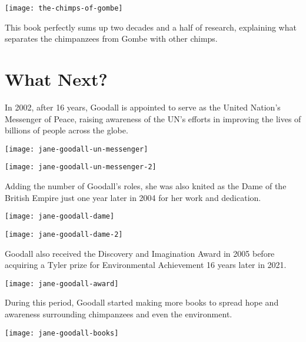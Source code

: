 \documentclass[12pt]{report}
\begin{document}
\texttt{[image: the-chimps-of-gombe]}

This book perfectly sums up two decades and a half of research, explaining what
separates the chimpanzees from Gombe with other chimps.

\pagebreak

\section*{What Next?}

In 2002, after 16 years, Goodall is appointed to serve as the United Nation's
Messenger of Peace, raising awareness of the UN's efforts in improving the
lives of billions of people across the globe.

\texttt{[image: jane-goodall-un-messenger]}

\texttt{[image: jane-goodall-un-messenger-2]}

\pagebreak

Adding the number of Goodall's roles, she was also knited as the Dame of the
British Empire just one year later in 2004 for her work and dedication.

\texttt{[image: jane-goodall-dame]}

\texttt{[image: jane-goodall-dame-2]}

\pagebreak

Goodall also received the Discovery and Imagination Award in 2005 before
acquiring a Tyler prize for Environmental Achievement 16 years later in 2021.

\texttt{[image: jane-goodall-award]}

During this period, Goodall started making more books to spread hope and
awareness surrounding chimpanzees and even the environment.

\texttt{[image: jane-goodall-books]}

\pagebreak
\end{document}

